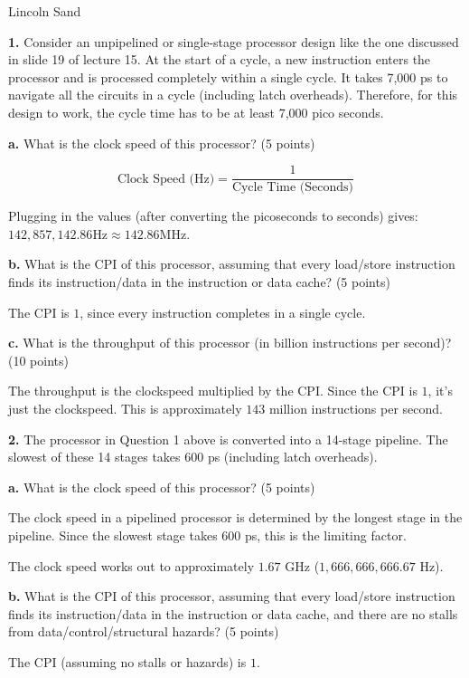\documentclass{article}
\begin{document}
\Large{Lincoln Sand}


\textbf{1.} Consider an unpipelined or single-stage processor design like the one discussed
in slide 19 of lecture 15. At the start of a cycle, a new instruction enters the processor
and is processed completely within a single cycle. It takes 7,000 ps to navigate all the
circuits in a cycle (including latch overheads). Therefore, for this design to work,
the cycle time has to be at least 7,000 pico seconds.

\textbf{a.} What is the clock speed of this processor? (5 points)

\[\text{Clock Speed (Hz)} = \frac{\text{1}}{\text{Cycle Time (Seconds)}}\]

Plugging in the values (after converting the picoseconds to seconds) gives:
$142,857,142.86 \text{Hz} \approx 142.86 \text{MHz}$.

\textbf{b.} What is the CPI of this processor, assuming that every load/store
instruction finds its instruction/data in the instruction or data cache? (5 points)

The CPI is $1$, since every instruction completes in a single cycle.

\textbf{c.} What is the throughput of this processor (in billion instructions per second)? (10 points)

The throughput is the clockspeed multiplied by the CPI. Since the CPI is $1$,
it's just the clockspeed. This is approximately $143$ million instructions per second.

\newpage

\textbf{2.} The processor in Question 1 above is converted into a 14-stage pipeline.
The slowest of these 14 stages takes 600 ps (including latch overheads).

\textbf{a.} What is the clock speed of this processor? (5 points)

The clock speed in a pipelined processor is determined by the longest stage in the pipeline.
Since the slowest stage takes $600$ ps, this is the limiting factor.

The clock speed works out to approximately $1.67$ GHz ($1,666,666,666.67$ Hz).

\textbf{b.} What is the CPI of this processor, assuming that every load/store instruction
finds its instruction/data in the instruction or data cache, and there are no stalls
from data/control/structural hazards? (5 points) 

The CPI (assuming no stalls or hazards) is $1$.
\end{document}
